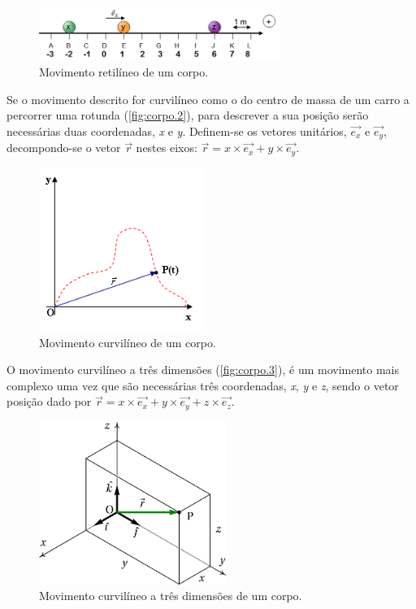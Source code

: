 \documentclass[a4paper,11pt,oneside]{report}
\begin{document}
\begin{figure}[h]
    \center
    \includegraphics[height=50pt]{figuras/corpoposicao.png}
    \caption{Movimento retilíneo de um corpo.}
    \label{fig:corpo.1}
\end{figure}

Se o movimento descrito for curvilíneo como o do centro de massa de um 
carro a percorrer uma rotunda (\autoref{fig:corpo.2}), para descrever a sua posição serão necessárias duas coordenadas,
\textit{x} e \textit{y}. Definem-se os vetores unitários, \(\vec{e_x}\) e \(\vec{e_y}\), 
decompondo-se o vetor \(\vec{r}\) nestes eixos: \(\vec{r} = \textit{x} \times \vec{e_x} + \textit{y} \times \vec{e_y}\).

\begin{figure}[h]
    \center
    \includegraphics[height=150pt]{figuras/vet13.png}
    \caption{Movimento curvilíneo de um corpo.}
    \label{fig:corpo.2}
\end{figure}

O movimento curvilíneo a três dimensões (\autoref{fig:corpo.3}),
é um movimento mais complexo uma vez que são necessárias três coordenadas, \textit{x}, \textit{y} e \textit{z}, sendo o vetor posição
dado por \(\vec{r} = \textit{x} \times \vec{e_x} + \textit{y} \times \vec{e_y} + \textit{z} \times \vec{e_z}\).

\begin{figure}[h]
    \center
    \includegraphics[height=150pt]{figuras/xyz.png}
    \caption{Movimento curvilíneo a três dimensões de um corpo.}
    \label{fig:corpo.3}
\end{figure}
\end{document}
